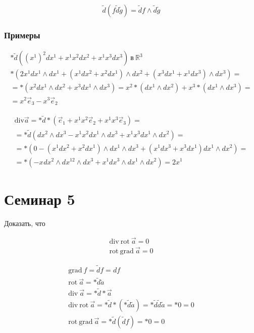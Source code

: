 $$\tilde{d}(f\tilde{d}\tilde{g}) = \tilde{d}f \wedge \tilde{d}\tilde{g}$$

\subsubsection{Примеры}

$$\begin{gather}
*\tilde{d}((x^{1})^{2}dx^{1} + x^{1}x^{2}dx^{2} + x^{1}x^{3}dx^{3}) \ \text{в} \ \mathbb{R}^{3} \\
*(2x^{1}dx^{1} \wedge dx^{1} + (x^{1}dx^{2} + x^{2}dx^{1})\wedge dx^{2} + (x^{3}dx^{1} + x^{1}dx^{3})\wedge dx^{3}) = \\
= *(x^{2}dx^{1}\wedge dx^{2} + x^{3}dx^{1} \wedge dx^{3}) = x^{2} *(dx^{1}\wedge dx^{2}) + x^{3}*(dx^{1} \wedge dx^{3}) = \\
= x^{2}\vec{e}_{3} - x^{3}\vec{e}_{2}
\end{gather}$$

$$\begin{gather}
\mathrm{div} \vec{a} = *\tilde{d}*(\vec{e}_{1}+x^{1}x^{2}\vec{e}_{2} + x^{1}x^{3}\vec{e}_{3}) = \\
= *\tilde{d}(dx^{2} \wedge dx^{3} - x^{1}x^{2}dx^{1}\wedge dx^{3} + x^{1}x^{3}dx^{1}\wedge dx^{2}) = \\
= *(0 - (x^{1}dx^{2} + x^{2}dx^{1}) \wedge dx^{1}\wedge dx^{3} + (x^{1}dx^{3} + x^{3}dx^{1})dx^{1}\wedge dx^{2}) = \\
= *(-x^{}dx^{2}\wedge dx^{12}\wedge dx^{3} + x^{1}dx^{3}\wedge dx^{1}\wedge dx^{2}) = 2x^{1}
\end{gather}$$

\section{Семинар 5}

Доказать, что

$$\begin{gather}
\mathrm{div} \ \mathrm{rot} \ \vec{a} = 0 \\
\mathrm{rot} \ \mathrm{grad} \ \vec{a} = 0
\end{gather}$$

$$\begin{gather}
\mathrm{grad} \ f = \tilde{d}f = df \\
\mathrm{rot} \ \vec{a} = *\tilde{d}\tilde{a} \\
\mathrm{div} \ \vec{a} = *\tilde{d}*\vec{a} \\
\mathrm{div} \ \mathrm{rot} \ \vec{a} = *\tilde{d}*(*\tilde{d}\tilde{a}) = *\tilde{d}\tilde{d}\tilde{a} = *0 = 0 \\
\mathrm{rot} \ \mathrm{grad} \ \vec{a} = *\tilde{d}(\tilde{d}f) = *0 = 0
\end{gather}$$

